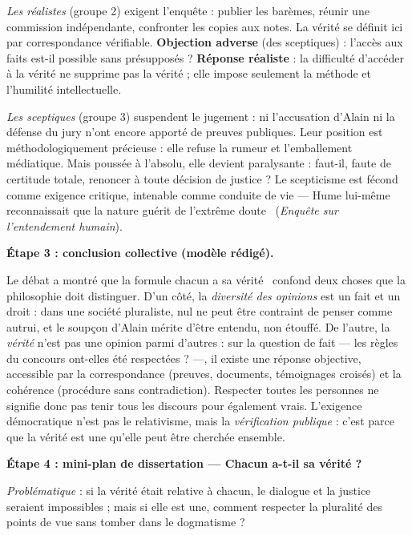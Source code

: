 \documentclass[11pt]{article}
\begin{document}
\begin{exoresolu}
\emph{Les réalistes} (groupe 2) exigent l'enquête : publier les barèmes, réunir une commission indépendante, confronter les copies aux notes. La vérité se définit ici par correspondance vérifiable. \textbf{Objection adverse} (des sceptiques) : l'accès aux faits est-il possible sans présupposés ? \textbf{Réponse réaliste} : la difficulté d'accéder à la vérité ne supprime pas la vérité ; elle impose seulement la méthode et l'humilité intellectuelle.

\emph{Les sceptiques} (groupe 3) suspendent le jugement : ni l'accusation d'Alain ni la défense du jury n'ont encore apporté de preuves publiques. Leur position est méthodologiquement précieuse : elle refuse la rumeur et l'emballement médiatique. Mais poussée à l'absolu, elle devient paralysante : faut-il, faute de certitude totale, renoncer à toute décision de justice ? Le scepticisme est fécond comme exigence critique, intenable comme conduite de vie — Hume lui-même reconnaissait que \guillemotleft la nature guérit de l'extrême doute \guillemotright\ (\emph{Enquête sur l'entendement humain}).

\textbf{Étape 3 : conclusion collective (modèle rédigé).}

\guillemotleft Le débat a montré que la formule \guillemotleft chacun a sa vérité \guillemotright\ confond deux choses que la philosophie doit distinguer. D'un côté, la \emph{diversité des opinions} est un fait et un droit : dans une société pluraliste, nul ne peut être contraint de penser comme autrui, et le soupçon d'Alain mérite d'être entendu, non étouffé. De l'autre, la \emph{vérité} n'est pas une opinion parmi d'autres : sur la question de fait — les règles du concours ont-elles été respectées ? —, il existe une réponse objective, accessible par la correspondance (preuves, documents, témoignages croisés) et la cohérence (procédure sans contradiction). Respecter toutes les personnes ne signifie donc pas tenir tous les discours pour également vrais. L'exigence démocratique n'est pas le relativisme, mais la \emph{vérification publique} : c'est parce que la vérité est une qu'elle peut être cherchée ensemble. \guillemotright

\textbf{Étape 4 : mini-plan de dissertation — \guillemotleft Chacun a-t-il sa vérité ? \guillemotright}

\emph{Problématique} : si la vérité était relative à chacun, le dialogue et la justice seraient impossibles ; mais si elle est une, comment respecter la pluralité des points de vue sans tomber dans le dogmatisme ?


\end{exoresolu}
\end{document}
